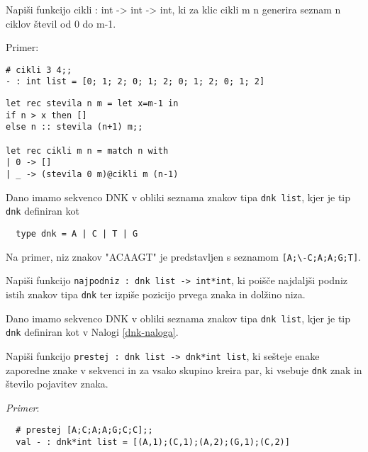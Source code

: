 \begin{ex}
  Napi\v si funkcijo cikli : int -> int -> int, ki za klic cikli m n
  generira seznam n ciklov \v stevil od 0 do m-1.

\noindent\/Primer:
\begin{lstlisting}
# cikli 3 4;; 
- : int list = [0; 1; 2; 0; 1; 2; 0; 1; 2; 0; 1; 2]
\end{lstlisting}

\begin{sol}
\begin{lstlisting}
let rec stevila n m = let x=m-1 in
if n > x then []
else n :: stevila (n+1) m;;

let rec cikli m n = match n with
| 0 -> []
| _ -> (stevila 0 m)@cikli m (n-1)
\end{lstlisting}
\end{sol}

\end{ex} 
\begin{ex}
  \label{dnk-naloga}
  Dano imamo sekvenco DNK v obliki seznama znakov tipa \lstinline{dnk list},
  kjer je tip \lstinline{dnk} definiran kot

  \begin{lstlisting}
  type dnk = A | C | T | G
  \end{lstlisting}
 
  Na primer, niz znakov "ACAAGT"  je predstavljen s seznamom 
  \lstinline{[A;\-C;A;A;G;T]}. 

  Napi\v si funkcijo \lstinline{najpodniz : dnk list -> int*int}, ki
  poi\v s\v ce najdalj\v si podniz istih znakov tipa \lstinline{dnk} ter
  izpi\v se pozicijo prvega znaka in dol\v zino niza.


\end{ex} 
\begin{ex}
  Dano imamo sekvenco DNK v obliki seznama znakov tipa \lstinline{dnk list},
  kjer je tip \lstinline{dnk} definiran kot v Nalogi \ref{dnk-naloga}.

  Napi\v si funkcijo \lstinline{prestej : dnk list -> dnk*int list}, ki
  se\v steje enake zaporedne znake v sekvenci in za vsako skupino
  kreira par, ki vsebuje \lstinline{dnk} znak in \v stevilo pojavitev
  znaka.

  \emph{Primer}: 
  \begin{lstlisting}
  # prestej [A;C;A;A;G;C;C];;
  val - : dnk*int list = [(A,1);(C,1);(A,2);(G,1);(C,2)]
  \end{lstlisting}


\end{ex} 
